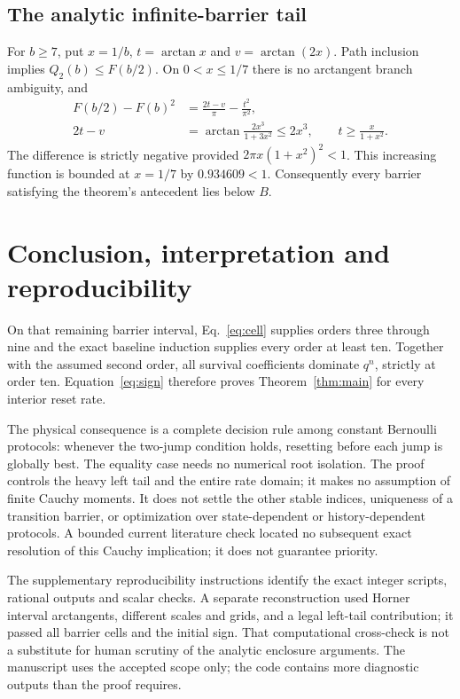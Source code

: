 \documentclass[11pt]{article}
\begin{document}
\subsection{The analytic infinite-barrier tail}
For $b\ge7$, put $x=1/b$, $t=\arctan x$ and $v=\arctan(2x)$.
Path inclusion implies $Q_2(b)\le F(b/2)$. On $0<x\le1/7$ there is no
arctangent branch ambiguity, and
\begin{align}
 F(b/2)-F(b)^2&=\frac{2t-v}{\pi}-\frac{t^2}{\pi^2},\\
 2t-v&=\arctan\frac{2x^3}{1+3x^2}\le2x^3,\qquad
 t\ge\frac{x}{1+x^2}.
\end{align}
The difference is strictly negative provided
$2\pi x(1+x^2)^2<1$. This increasing function is bounded at $x=1/7$
by $0.934609<1$. Consequently every barrier satisfying the theorem's
antecedent lies below $B$.

\section{Conclusion, interpretation and reproducibility}
On that remaining barrier interval, Eq.~\eqref{eq:cell} supplies orders
three through nine and the exact baseline induction supplies every order
at least ten. Together with the assumed second order, all survival
coefficients dominate $q^n$, strictly at order ten. Equation~\eqref{eq:sign}
therefore proves Theorem~\ref{thm:main} for every interior reset rate.

The physical consequence is a complete decision rule among constant
Bernoulli protocols: whenever the two-jump condition holds, resetting before
each jump is globally best. The equality case needs no numerical root
isolation. The proof controls the heavy left tail and the entire rate domain;
it makes no assumption of finite Cauchy moments. It does not settle the
other stable indices, uniqueness of a transition barrier, or optimization
over state-dependent or history-dependent protocols. A bounded current
literature check located no subsequent exact resolution of this Cauchy
implication; it does not guarantee priority.

The supplementary reproducibility instructions identify the exact integer
scripts, rational outputs and scalar checks. A separate reconstruction used
Horner interval arctangents, different scales and grids, and a legal
left-tail contribution; it passed all barrier cells and the initial sign.
That computational cross-check is not a substitute for human scrutiny of
the analytic enclosure arguments. The manuscript uses the accepted scope
only; the code contains more diagnostic outputs than the proof requires.
\end{document}
